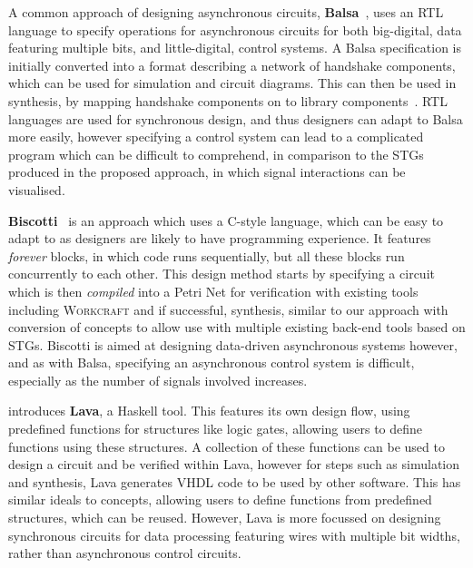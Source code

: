 \documentclass[british, journal]{IEEEtran}
\newcommand{\noun}[1]{\textsc{#1}}
\begin{document}
A common approach of designing asynchronous circuits,
\textbf{Balsa}~\cite{edwards2002balsa}, uses an RTL language to specify
operations for asynchronous circuits for both big-digital, data featuring
multiple bits, and little-digital, control systems. A Balsa specification is
initially converted into a format describing a network of handshake components,
which can be used for simulation and circuit diagrams. This can then be used in
synthesis, by mapping handshake components on to library
components~\cite{van1993handshake}. RTL languages
are used for synchronous design, and thus designers can adapt to Balsa
more easily, however specifying a control system can lead to a complicated
program which can be difficult to
comprehend, in comparison to the STGs produced in the proposed approach,
in which signal interactions can be visualised.

\textbf{Biscotti}~\cite{5232351} is an approach which uses a C-style language,
which can be easy to adapt to as designers are likely to have programming
experience. It features
\emph{forever} blocks, in which code runs sequentially, but all these
blocks run concurrently to each other. This design method starts by
specifying a circuit which is then
\emph{compiled} into a Petri Net for verification with existing tools
including \noun{Workcraft} and if successful, synthesis, similar to our
approach with conversion of concepts to allow
use with multiple existing back-end tools based on STGs. Biscotti is aimed at
designing data-driven asynchronous systems however, and as with Balsa,
specifying an asynchronous control system is
difficult, especially as the number of signals involved increases.

\cite{bjesse1998lava} introduces \textbf{Lava}, a Haskell tool. This features its own design flow, using predefined functions for structures like logic gates, allowing users to define
functions using these structures. A collection of these functions can be used to design a circuit and be verified within Lava, however for steps such as simulation and synthesis, Lava
generates VHDL code to be used by other software. This has similar ideals to concepts, allowing users to define functions from predefined structures, which can be reused. However,
Lava is more focussed on designing synchronous circuits for data processing featuring wires with multiple bit widths, rather than asynchronous control circuits.
\end{document}

